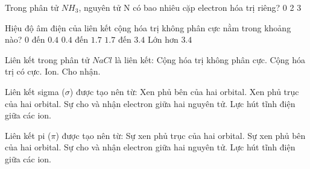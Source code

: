 \begin{ex}
Trong phân tử $NH_3$, nguyên tử N có bao nhiêu cặp electron hóa trị riêng?
    \choice
    {0}
    {}
    {2}
    {3}
\end{ex}

\begin{ex}
Hiệu độ âm điện của liên kết cộng hóa trị không phân cực nằm trong khoảng nào?
    \choice
    {\True $0$ đến $0.4$}
    {$0.4$ đến $1.7$}
    {$1.7$ đến $3.4$}
    {Lớn hơn $3.4$}
\end{ex}

\begin{ex}
Liên kết trong phân tử $NaCl$ là liên kết:
    \choice
    {Cộng hóa trị không phân cực.}
    {Cộng hóa trị có cực.}
    {\True Ion.}
    {Cho nhận.}
\end{ex}

\begin{ex}
Liên kết sigma ($\sigma$) được tạo nên từ:
    \choice
    {Xen phủ bên của hai orbital.}
    {\True Xen phủ trục của hai orbital.}
    {Sự cho và nhận electron giữa hai nguyên tử.}
    {Lực hút tĩnh điện giữa các ion.}
\end{ex}

\begin{ex}
Liên kết pi ($\pi$) được tạo nên từ:
    \choice
    {Sự xen phủ trục của hai orbital.}
    {\True Sự xen phủ bên của hai orbital.}
    {Sự cho và nhận electron giữa hai nguyên tử.}
    {Lực hút tĩnh điện giữa các ion.}
\end{ex}


